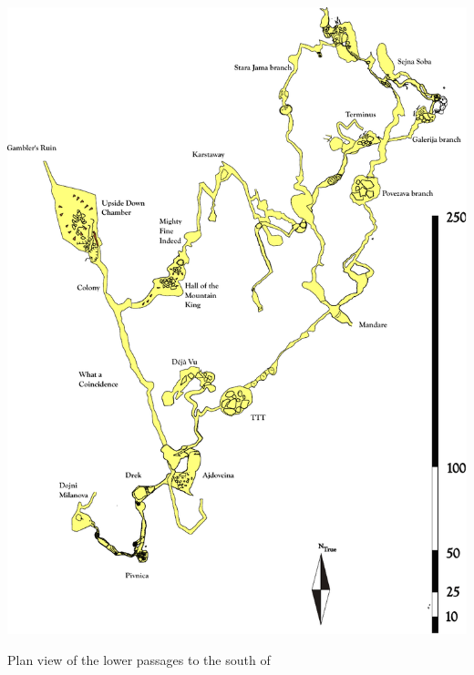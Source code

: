 \begin{pagesurvey}
\centering
\includegraphics[width=\textwidth]{images/pdf_maps/primalow.pdf}
\caption[Below Sejna Soba]{Plan view of the lower passages to the south of \protect{}}
\label{prima low trip}
\end{pagesurvey}
